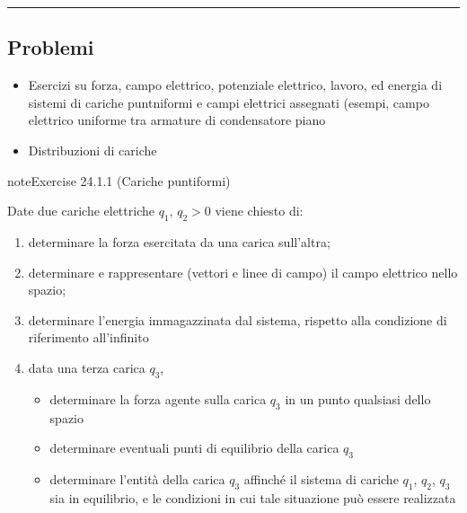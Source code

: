 \documentclass[letterpaper,10pt,italian]{jupyterBook}
\begin{document}
\bigskip\hrule\bigskip


\sphinxstepscope


\subsection{Problemi}
\label{\detokenize{ch/electromagnetism/electrostatics-problems:problemi}}\label{\detokenize{ch/electromagnetism/electrostatics-problems:physics-hs-electromagnetism-electrostatics-problems}}\label{\detokenize{ch/electromagnetism/electrostatics-problems::doc}}\begin{itemize}
\item {} 
\sphinxAtStartPar
Esercizi su forza, campo elettrico, potenziale elettrico, lavoro, ed energia di sistemi di cariche puntniformi e campi elettrici assegnati (esempi, campo elettrico uniforme tra armature di condensatore piano

\item {} 
\sphinxAtStartPar
Distribuzioni di cariche

\end{itemize}
 \label{exercise:ch/electromagnetism/electrostatics-problems-exercise-0}

\begin{sphinxadmonition}{note}{Exercise 24.1.1 (Cariche puntiformi)}



\sphinxAtStartPar
Date due cariche elettriche \(q_1, \, q_2 > 0\) viene chiesto di:
\begin{enumerate}
%
\item {} 
\sphinxAtStartPar
determinare la forza esercitata da una carica sull’altra;

\item {} 
\sphinxAtStartPar
determinare e rappresentare (vettori e linee di campo) il campo elettrico nello spazio;

\item {} 
\sphinxAtStartPar
determinare l’energia immagazzinata dal sistema, rispetto alla condizione di riferimento all’infinito

\item {} 
\sphinxAtStartPar
data una terza carica \(q_3\),
\begin{itemize}
\item {} 
\sphinxAtStartPar
determinare la forza agente sulla carica \(q_3\) in un punto qualsiasi dello spazio

\item {} 
\sphinxAtStartPar
determinare eventuali punti di equilibrio della carica \(q_3\)

\item {} 
\sphinxAtStartPar
determinare l’entità della carica \(q_3\) affinché il sistema di cariche \(q_1\), \(q_2\), \(q_3\) sia in equilibrio, e le condizioni in cui tale situazione può essere realizzata

\end{itemize}

\end{enumerate}
\end{sphinxadmonition}
 \label{exercise:ch/electromagnetism/electrostatics-problems-exercise-1}
\end{document}
